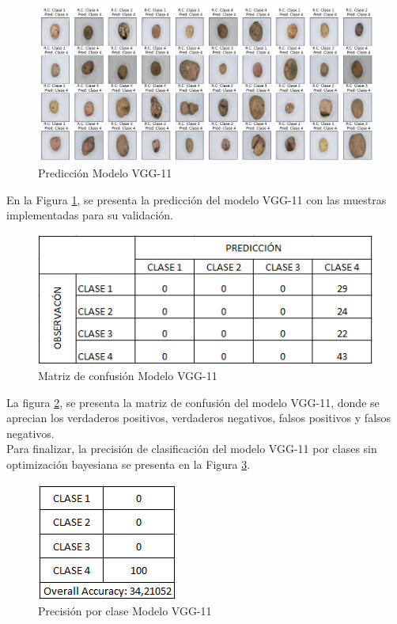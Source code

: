 			\newpage
			\begin{figure}[ht]
				\centering
				\includegraphics[scale=0.35]{Figs/107.png}
				\caption{Predicción Modelo VGG-11}
				\label{fig:Pre_VGG11}
			\end{figure}
			
			En la Figura \ref{fig:Pre_VGG11}, se presenta la predicción del modelo VGG-11 con las muestras implementadas para su validación.
			
			\begin{figure}[ht]
				\centering
				\includegraphics[scale=0.55]{Figs/51.png}
				\caption{Matriz de confusión Modelo VGG-11}
				\label{fig:MC_VGG11}
			\end{figure}
			
			La figura \ref{fig:MC_VGG11}, se presenta la matriz de confusión del modelo VGG-11, donde se aprecian los verdaderos positivos, verdaderos negativos, falsos positivos y falsos negativos.
			\\
			Para finalizar, la precisión de clasificación del modelo VGG-11 por clases sin optimización bayesiana se presenta en la Figura \ref{fig:clase_VGG11}.  
			
			\begin{figure}[ht]
				\centering
				\includegraphics[scale=0.6]{Figs/52.png}
				\caption{Precisión por clase Modelo VGG-11}
				\label{fig:clase_VGG11}
			\end{figure}
		

